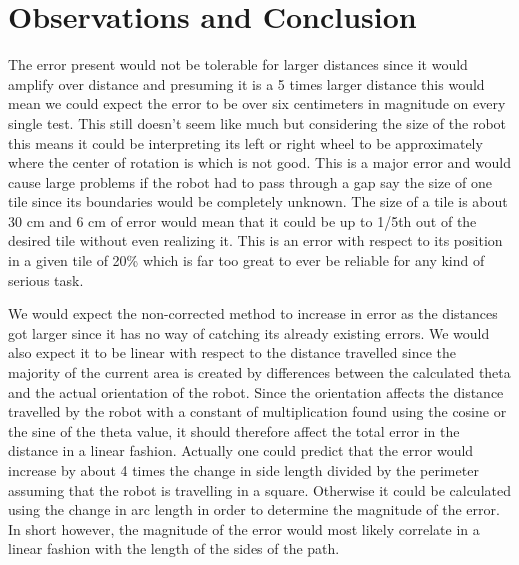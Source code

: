 \documentclass[letterpaper,12pt]{article}
\begin{document}
\section{Observations and Conclusion}{The error present would not be tolerable for larger distances since it would amplify over distance and presuming it is a 5 times larger distance this would mean we could expect the error to be over six centimeters in magnitude on every single test. This still doesn't seem like much but considering the size of the robot this means it could be interpreting its left or right wheel to be approximately where the center of rotation is which is not good. This is a major error and would cause large problems if the robot had to pass through a gap say the size of one tile since its boundaries would be completely unknown. The size of a tile is about 30 cm and 6 cm of error would mean that it could be up to 1/5th out of the desired tile without even realizing it. This is an error with respect to its position in a given tile of 20\% which is far too great to ever be reliable for any kind of serious task.
 
We would expect the non-corrected method to increase in error as the distances got larger since it has no way of catching its already existing errors. We would also expect it to be linear with respect to the distance travelled since the majority of the current area is created by differences between the calculated theta and the actual orientation of the robot. Since the orientation affects the distance travelled by the robot with a constant of multiplication found using the cosine or the sine of the theta value, it should therefore affect the total error in the distance in a linear fashion. Actually one could predict that the error would increase by about 4 times the change in side length divided by the perimeter assuming that the robot is travelling in a square. Otherwise it could be calculated using the change in arc length in order to determine the magnitude of the error. In short however, the magnitude of the error would most likely correlate in a linear fashion with the length of the sides of the path. 
}
\end{document}
